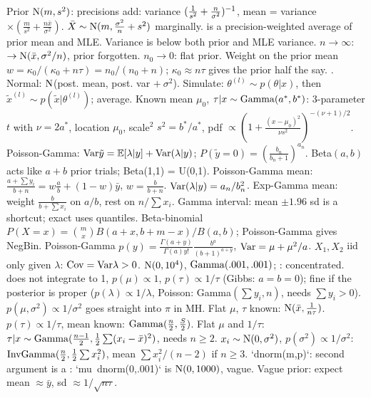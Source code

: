 Prior $\mathrm{N}(m,s^2)$: precisions add: variance $(\frac1{s^2}+\frac n{\sigma^2})^{-1}$, mean = variance $\times(\frac m{s^2}+\frac{n\bar x}{\sigma^2})$. $\bar X\sim\mathrm{N}(m,\frac{\sigma^2}n+s^2)$ marginally.
\sk{} is a precision-weighted average of prior mean and MLE. Variance is below both prior and MLE variance. $n\to\infty$: $\to\mathrm{N}(\bar x,\sigma^2/n)$, prior forgotten. $n_0\to0$: flat prior. Weight on the prior mean $w=\kappa_0/(\kappa_0+n\tau)=n_0/(n_0+n)$; $\kappa_0\approx n\tau$ gives the prior half the say.
\sk{} . Normal: $\mathrm{N}$(post. mean, post. var $+\ \sigma^2$). Simulate: $\theta^{(l)}\sim p(\theta|x)$, then $\tilde x^{(l)}\sim p(\tilde x|\theta^{(l)})$; average. Known mean $\mu_0$, $\tau|x\sim\mathrm{Gamma}(a^*,b^*)$: 3-parameter $t$ with $\nu=2a^*$, location $\mu_0$, scale$^2$ $s^2=b^*/a^*$, pdf $\propto(1+\frac{(x-\mu_0)^2}{\nu s^2})^{-(\nu+1)/2}$. Poisson-Gamma: $\mathrm{Var}\tilde y=\mathbb{E}[\lambda|y]+\mathrm{Var}(\lambda|y)$; $P(\tilde y=0)=(\frac{b_n}{b_n+1})^{a_n}$.
\sk{} Beta$(a,b)$ acts like $a+b$ prior trials; Beta(1,1) = U(0,1). Poisson-Gamma mean: $\frac{a+\sum y_i}{b+n}=w\frac ab+(1-w)\bar y$, $w=\frac b{b+n}$. $\mathrm{Var}(\lambda|y)=a_n/b_n^2$. Exp-Gamma mean: weight $\frac b{b+\sum x_i}$ on $a/b$, rest on $n/\sum x_i$. Gamma interval: mean $\pm1.96$ sd is a shortcut; exact uses quantiles.
\sk{} Beta-binomial $P(X{=}x)=\binom mx B(a+x,b+m-x)/B(a,b)$; Poisson-Gamma gives NegBin. Poisson-Gamma $p(y)=\frac{\Gamma(a+y)}{\Gamma(a)y!}\frac{b^a}{(b+1)^{a+y}}$, $\mathrm{Var}=\mu+\mu^2/a$. $X_1,X_2$ iid only given $\lambda$: $\mathrm{Cov}=\mathrm{Var}\lambda>0$.
\sk{}  $\mathrm{N}(0,10^4)$, $\mathrm{Gamma}(.001,.001)$; : concentrated.  does not integrate to 1, $p(\mu)\propto1$, $p(\tau)\propto1/\tau$ (Gibbs: $a=b=0$); fine if the posterior is proper ($p(\lambda)\propto1/\lambda$, Poisson: Gamma$(\sum y_i,n)$, needs $\sum y_i>0$). $p(\mu,\sigma^2)\propto1/\sigma^2$ goes straight into $\pi$ in MH. Flat $\mu$, $\tau$ known: $\mathrm{N}(\bar x,\frac1{n\tau})$. $p(\tau)\propto1/\tau$, mean known: $\mathrm{Gamma}(\frac n2,\frac S2)$. Flat $\mu$ and $1/\tau$: $\tau|x\sim\mathrm{Gamma}(\frac{n-1}2,\frac12\sum(x_i-\bar x)^2)$, needs $n\ge2$. $x_i\sim\mathrm{N}(0,\sigma^2)$, $p(\sigma^2)\propto1/\sigma^2$: $\mathrm{InvGamma}(\frac n2,\frac12\sum x_i^2)$, mean $\sum x_i^2/(n-2)$ if $n\ge3$.
\sk{} `dnorm(m,p)`: second argument is a : `mu~dnorm(0,.001)` is $\mathrm{N}(0,1000)$, vague. Vague prior: expect mean $\approx\bar y$, sd $\approx1/\sqrt{n\tau}$.
